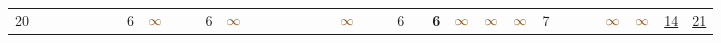 \begin{landscape}
\begin{table}
\begin{adjustwidth}{-2.6cm}{}
{\begin{tabular}{l|lllllllllllllllllllllllllllllllll|ll}
		20   &            &                                                                 &                                                                 &                                                                 &                                                                 &                                                                 & 6                                                               & $\textcolor[rgb]{0.541,0.29,0.043}{\infty}$ &                                                                 &                                                                 & 6                                                               & $\textcolor[rgb]{0.541,0.29,0.043}{\infty}$ &                                                                 &                                                                 &                                                                 &                                                                 &                                                                 &                                                                 & $\textcolor[rgb]{0.541,0.29,0.043}{\infty}$ &                                                                 &                                                                 & 6                                                               &                                                                 & \textbf{6}                                                      & $\textcolor[rgb]{0.541,0.29,0.043}{\infty}$ & $\textcolor[rgb]{0.541,0.29,0.043}{\infty}$ & $\textcolor[rgb]{0.541,0.29,0.043}{\infty}$ & 7                                                               &                                                                 &                                                                 &                                                                 & $\textcolor[rgb]{0.541,0.29,0.043}{\infty}$ & $\textcolor[rgb]{0.541,0.29,0.043}{\infty}$ & \uline{14} & \uline{21}  \\

\end{tabular}}
\end{adjustwidth}
\end{table}
\end{landscape}
